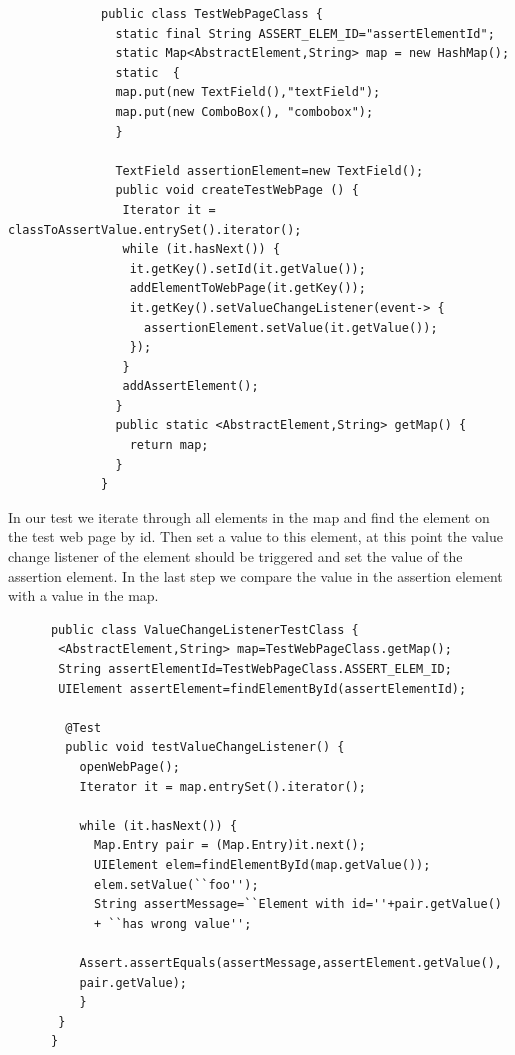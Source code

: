 \documentclass{article}
\begin{document}
			\begin{lstlisting}
			 public class TestWebPageClass {
			   static final String ASSERT_ELEM_ID="assertElementId";
			   static Map<AbstractElement,String> map = new HashMap();
			   static  {
  			   map.put(new TextField(),"textField");
  			   map.put(new ComboBox(), "combobox");
			   }
			   
			   TextField assertionElement=new TextField();
			   public void createTestWebPage () {
			    Iterator it = classToAssertValue.entrySet().iterator();
			    while (it.hasNext()) {
			     it.getKey().setId(it.getValue());
			     addElementToWebPage(it.getKey());
			     it.getKey().setValueChangeListener(event-> {
			       assertionElement.setValue(it.getValue());
			     });
			    }
			    addAssertElement();
			   }  
			   public static <AbstractElement,String> getMap() {
			     return map;
			   }
			 }
			\end{lstlisting}
      
      In our test we iterate through all elements in the map and find the
      element on the test web page by id. Then set a value to this element,
      at this point the value change listener of the element should be triggered and set the value
      of the assertion element. In the last step we compare the value in the
      assertion element with a value in the map.
			
      \begin{lstlisting}
      public class ValueChangeListenerTestClass {
       <AbstractElement,String> map=TestWebPageClass.getMap();
       String assertElementId=TestWebPageClass.ASSERT_ELEM_ID;
       UIElement assertElement=findElementById(assertElementId);
       
        @Test
        public void testValueChangeListener() {
          openWebPage();
          Iterator it = map.entrySet().iterator();
          
          while (it.hasNext()) {
            Map.Entry pair = (Map.Entry)it.next();
            UIElement elem=findElementById(map.getValue());
            elem.setValue(``foo'');
            String assertMessage=``Element with id=''+pair.getValue()
            + ``has wrong value'';
          
          Assert.assertEquals(assertMessage,assertElement.getValue(),
          pair.getValue);
          }
       }
      }
			\end{lstlisting}
  
\end{document}
